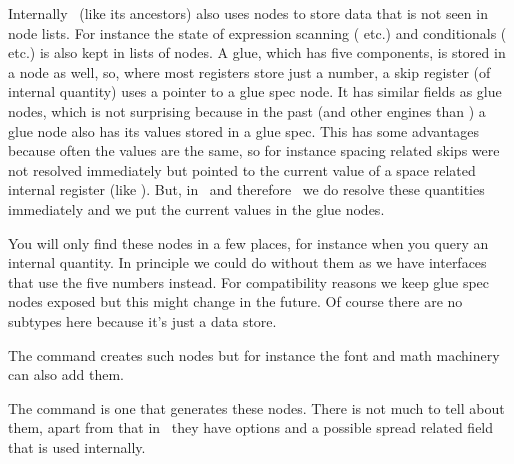 
\stopsubsection

\startsubsection[title={gluespec}]

Internally \LUAMETATEX\ (like its ancestors) also uses nodes to store data that
is not seen in node lists. For instance the state of expression scanning (\type
{\dimexpr} etc.) and conditionals (\type {\ifcase} etc.) is also kept in lists of
nodes. A glue, which has five components, is stored in a node as well, so, where
most registers store just a number, a skip register (of internal quantity) uses a
pointer to a glue spec node. It has similar fields as glue nodes, which is not
surprising because in the past (and other engines than \LUATEX) a glue node also
has its values stored in a glue spec. This has some advantages because often the
values are the same, so for instance spacing related skips were not resolved
immediately but pointed to the current value of a space related internal register
(like \type {\spaceskip}). But, in \LUATEX\ and therefore \LUAMETATEX\ we do
resolve these quantities immediately and we put the current values in the glue
nodes.


You will only find these nodes in a few places, for instance when you query an
internal quantity. In principle we could do without them as we have interfaces
that use the five numbers instead. For compatibility reasons we keep glue spec
nodes exposed but this might change in the future. Of course there are no
subtypes here because it's just a data store.


\stopsubsection

\startsubsection[title={kern}]

The \type {\kern} command creates such nodes but for instance the font and math
machinery can also add them.



\stopsubsection

\startsubsection[title={penalty}]

The \type {\penalty} command is one that generates these nodes. There is not much
to tell about them, apart from that in \LUAMETATEX\ they have options and a
possible spread related  field that is used internally.

